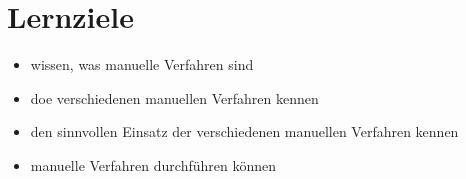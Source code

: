 \section{Lernziele}

\begin{itemize}
    \item wissen, was manuelle Verfahren sind
    \item doe verschiedenen manuellen Verfahren kennen
    \item den sinnvollen Einsatz der verschiedenen manuellen Verfahren kennen
    \item manuelle Verfahren durchführen können
\end{itemize}
